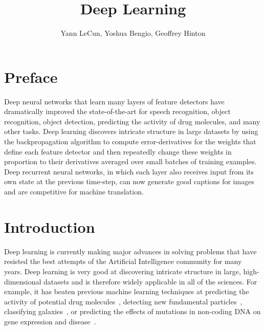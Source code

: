 \documentclass[]{article}
\title{Deep Learning}
\author{Yann LeCun, Yoshua Bengio, Geoffrey Hinton}
\begin{document}
\maketitle

\section{Preface}

Deep neural networks that learn many layers of feature detectors have
dramatically improved the state-of-the-art for speech recognition, object
recognition, object detection, predicting the activity of drug molecules,
and many other tasks. Deep learning discovers intricate structure in large
datasets by using the backpropagation algorithm to compute
error-derivatives for the weights that define each feature detector and
then repeatedly change these weights in proportion to their derivatives
averaged over small batches of training examples.  Deep recurrent neural
networks, in which each layer also receives input from its own state at the
previous time-step, can now generate good captions for images and are
competitive for machine translation.

\section{Introduction}

Deep learning is currently making major advances in solving problems that
have resisted the best attempts of the Artificial Intelligence community
for many years. Deep learning is very good at discovering intricate
structure in large, high-dimensional datasets and is therefore widely
applicable in all of the sciences. For example, it has beaten previous
machine learning techniques at predicting the activity of potential drug
molecules~\cite{Dahl}, detecting new fundamental particles~\cite{??},
classifying galaxies~\cite{??}, or predicting the effects of mutations in
non-coding DNA on gene expression and disease~\cite{Frey}.
\end{document}
